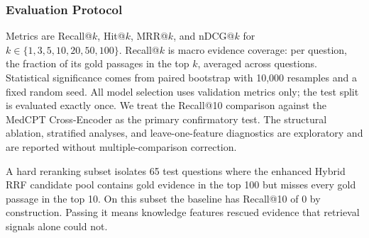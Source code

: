 \subsubsection{Evaluation Protocol}

Metrics are Recall@$k$, Hit@$k$, MRR@$k$, and nDCG@$k$ for $k \in \{1,3,5,10,20,50,100\}$. Recall@$k$ is macro evidence coverage: per question, the fraction of its gold passages in the top $k$, averaged across questions. Statistical significance comes from paired bootstrap with 10,000 resamples and a fixed random seed. All model selection uses validation metrics only; the test split is evaluated exactly once. We treat the Recall@10 comparison against the MedCPT Cross-Encoder as the primary confirmatory test. The structural ablation, stratified analyses, and leave-one-feature diagnostics are exploratory and are reported without multiple-comparison correction.

A hard reranking subset isolates 65 test questions where the enhanced Hybrid RRF candidate pool contains gold evidence in the top 100 but misses every gold passage in the top 10. On this subset the baseline has Recall@10 of 0 by construction. Passing it means knowledge features rescued evidence that retrieval signals alone could not.

